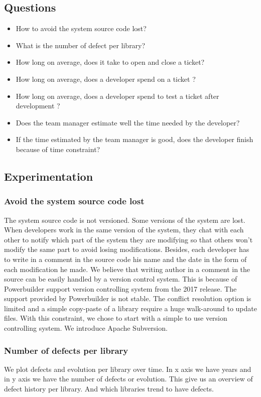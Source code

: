 \documentclass[10pt,conference]{IEEEtran}
\begin{document}
 \subsection{Questions}
 \begin{itemize}
 \item How to avoid the system source code lost?
 \item What is the number of defect per library?
 \item How long on average, does it take to open and close a ticket?
 \item How long on average,  does a developer spend on a ticket ?
 \item How long on average, does a developer spend to test a ticket after development ?
 \item Does the team manager estimate well  the time needed by the developer?
 \item If the time estimated by the team manager is good, does the developer finish because  of time constraint?
 \end{itemize}
 
 \subsection{Experimentation}

\subsubsection{Avoid the system source code lost}
The system source code is not versioned.  Some versions of the system are lost. 
When developers work in the same version of the system, they chat with each other to notify which part of the system they are modifying so that others won't modify the same part to avoid losing modifications. Besides, each developer has to write in a comment in the source code his name and the date in the form of each modification he made.  We believe that writing author in a comment in the source can be easily handled by a version control system.
This is because of Powerbuilder support version controlling system from the 2017 release. 
The support provided by Powerbuilder is not stable.
The conflict resolution option is limited and a simple copy-paste of a library require a huge walk-around to update files. 
With this constraint, we chose to start with a simple to use version controlling system. We introduce Apache Subversion. 
 \subsubsection{Number of defects per library}
We plot  defects and evolution per library over time.  In x axis we have years and in y axis  we have the number of defects  or evolution.
This give us an overview of defect  history per library. And  which libraries   trend to have defects.
\end{document}

